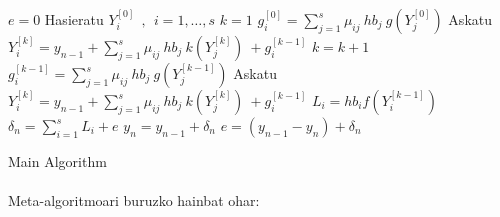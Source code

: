 \begin{algorithm}[H]
 \BlankLine
  $e=0$\;
  {
   \BlankLine
   Hasieratu  $Y_{i}^{[0]} \ \ , \ \ i=1,\dots,s $\;   
   \BlankLine
   $k=1 $\;
   $g_{i}^{[0]}=\sum\limits_{j=1}^{s} \mu_{ij} \ hb_j \ g(Y_{j}^{[0]}) $\;
   Askatu $Y_i^{[k]}=y_{n-1}+ \sum\limits_{j=1}^{s} \mu_{ij} \ hb_j \ k(Y_{j}^{[k]}) \ +g_{i}^{[k-1]} $\;
   {
    \BlankLine 
    $k=k+1$\;
    $g_{i}^{[k-1]}=\sum\limits_{j=1}^{s} \mu_{ij} \ hb_j \ g(Y_{j}^{[k-1]}) $\;
    Askatu $Y_i^{[k]}=y_{n-1}+ \sum\limits_{j=1}^{s} \mu_{ij} \ hb_j \ k(Y_{j}^{[k]}) \ +g_{i}^{[k-1]} $\;
   }
   \BlankLine
    $L_i= hb_i f(Y_i^{[k-1]})$\;
    $\delta_{n}= \sum\limits_{i=1}^{s} L_{i}+e $\;
    $y_{n}=y_{n-1}+ \delta_{n} $\;
    $e=(y_{n-1}-y_n)+\delta_n$\;
   \BlankLine
 }
 \caption{Main Algorithm}
\end{algorithm}

\paragraph*{} Meta-algoritmoari buruzko hainbat ohar:

